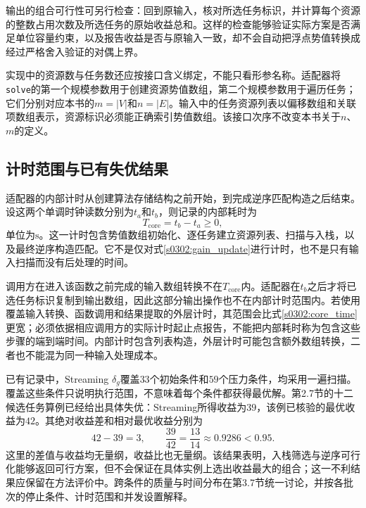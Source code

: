输出的组合可行性可另行检查：回到原输入，核对所选任务标识，并计算每个资源的整数占用次数及所选任务的原始收益总和。这样的检查能够验证实际方案是否满足单位容量约束，以及报告收益是否与原输入一致，却不会自动把浮点势值转换成经过严格舍入验证的对偶上界。

实现中的资源数与任务数还应按接口含义绑定，不能只看形参名称。适配器将\texttt{solve}的第一个规模参数用于创建资源势值数组，第二个规模参数用于遍历任务；它们分别对应本书的$m=|V|$和$n=|E|$。输入中的任务资源列表以偏移数组和关联项数组表示，资源标识必须能正确索引势值数组。该接口次序不改变本书关于$n$、$m$的定义。

\subsection{计时范围与已有失优结果}

适配器的内部计时从创建算法存储结构之前开始，到完成逆序匹配构造之后结束。设这两个单调时钟读数分别为$t_a$和$t_b$，则记录的内部耗时为
\begin{equation}
 T_{\mathrm{core}}=t_b-t_a\geq0,
\label{s0302:core_time}
\end{equation}
单位为$\mathrm{s}$。这一计时包含势值数组初始化、逐任务建立资源列表、扫描与入栈，以及最终逆序构造匹配。它不是仅对式\eqref{s0302:gain_update}进行计时，也不是只有输入扫描而没有后处理的时间。

调用方在进入该函数之前完成的输入数组转换不在$T_{\mathrm{core}}$内。适配器在$t_b$之后才将已选任务标识复制到输出数组，因此这部分输出操作也不在内部计时范围内。若使用覆盖输入转换、函数调用和结果提取的外层计时，其范围会比式\eqref{s0302:core_time}更宽；必须依据相应调用方的实际计时起止点报告，不能把内部耗时称为包含这些步骤的端到端时间。内部计时包含列表构造，外层计时可能包含额外数组转换，二者也不能混为同一种输入处理成本。

已有记录中，Streaming $\delta_g$覆盖$33$个初始条件和$59$个压力条件，均采用一遍扫描。覆盖这些条件只说明执行范围，不意味着每个条件都获得最优解。第2.7节的十二候选任务算例已经给出具体失优：Streaming所得收益为$39$，该例已核验的最优收益为$42$。其绝对收益差和相对最优收益分别为
\begin{equation}
 42-39=3,
 \qquad
 \frac{39}{42}=\frac{13}{14}\approx0.9286<0.95.
\label{s0302:toy_loss}
\end{equation}
这里的差值与收益均无量纲，收益比也无量纲。该结果表明，入栈筛选与逆序可行化能够返回可行方案，但不会保证在具体实例上选出收益最大的组合；这一不利结果应保留在方法评价中。跨条件的质量与时间分布在第3.7节统一讨论，并按各批次的停止条件、计时范围和并发设置解释。
